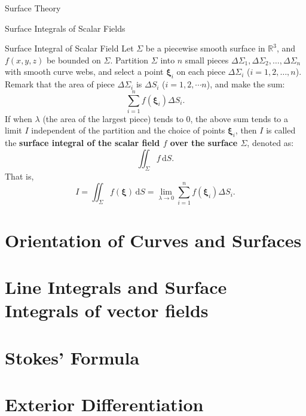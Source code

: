 \documentclass[11pt]{../../TexTemplate/elegantbook}
\begin{document}
\begin{leftbarTitle}{Surface Theory}\end{leftbarTitle}

\begin{leftbarTitle}{Surface Integrals of Scalar Fields}\end{leftbarTitle}
\begin{definition}{Surface Integral of Scalar Field}
    Let \(\Sigma\) be a piecewise smooth surface in \(\mathbb{R}^3\),
    and \(f(x, y, z)\) be bounded on \(\Sigma\).
    Partition \(\Sigma\) into \(n\) small pieces \(\Delta\Sigma_1, \Delta\Sigma_2, \ldots, \Delta\Sigma_n\)
    with smooth curve webs,
    and select a point \(\boldsymbol{\xi}_i\) on each piece \(\Delta\Sigma_i\) (\(i = 1, 2, \ldots, n\)).
    Remark that the area of piece \(\Delta\Sigma_i\) is \(\Delta S_i\) (\(i=1,2,\cdots n\)),
    and make the sum:
    \[
    \sum_{i=1}^{n} f(\boldsymbol{\xi}_i) \Delta S_i.
    \]
    If when \( \lambda \) (the area of the largest piece) tends to \(0\),
    the above sum tends to a limit \(I\) independent of the partition and the choice of points \(\boldsymbol{\xi}_i\),
    then \(I\) is called the \textbf{surface integral of the scalar field \(f\) over the surface \(\Sigma\)},
    denoted as:
    \[
    \iint_{\Sigma} f \, \mathrm{d}S.
    \]
    That is,
    \[
    I = \iint_{\Sigma} f(\boldsymbol{\xi}) \, \mathrm{d}S =
    \lim_{\lambda \to 0} \sum_{i=1}^{n} f(\boldsymbol{\xi}_i) \Delta S_i.
    \]
    
\end{definition}


\section{Orientation of Curves and Surfaces}

\section{Line Integrals and Surface Integrals of vector fields}

\section{Stokes' Formula}

\section{Exterior Differentiation}
\end{document}
